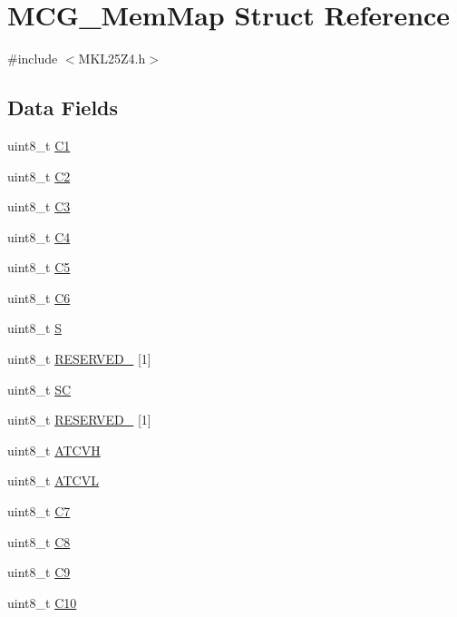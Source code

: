 \hypertarget{struct_m_c_g___mem_map}{}\section{M\+C\+G\+\_\+\+Mem\+Map Struct Reference}
\label{struct_m_c_g___mem_map}


{\ttfamily \#include $<$M\+K\+L25\+Z4.\+h$>$}

\subsection*{Data Fields}
\begin{DoxyCompactItemize}
\item 
uint8\+\_\+t \hyperlink{struct_m_c_g___mem_map_a433a36d1aeb9d033b502ee263c1495a1}{C1}
\item 
uint8\+\_\+t \hyperlink{struct_m_c_g___mem_map_a7323696b9a1cb6631b8c04ffad3947e5}{C2}
\item 
uint8\+\_\+t \hyperlink{struct_m_c_g___mem_map_a58ca70b30279c98af3471abe38280f01}{C3}
\item 
uint8\+\_\+t \hyperlink{struct_m_c_g___mem_map_a3c5615d70ed3f2d3664de1a8fdbe9983}{C4}
\item 
uint8\+\_\+t \hyperlink{struct_m_c_g___mem_map_a0e385950fe0f38c82eae57eb4ea2aaf3}{C5}
\item 
uint8\+\_\+t \hyperlink{struct_m_c_g___mem_map_ae7f9f9ae65de91e230a236ca4629380c}{C6}
\item 
uint8\+\_\+t \hyperlink{struct_m_c_g___mem_map_a65ee0333e0d5c462c7dd8c2402bf93be}{S}
\item 
uint8\+\_\+t \hyperlink{struct_m_c_g___mem_map_a4a2bbf23e6c51743e808ba42e79d6128}{R\+E\+S\+E\+R\+V\+E\+D\+\_} \mbox{[}1\mbox{]}
\item 
uint8\+\_\+t \hyperlink{struct_m_c_g___mem_map_aeff584aa52340d7c66dc06789ad05310}{SC}
\item 
uint8\+\_\+t \hyperlink{struct_m_c_g___mem_map_a612b54d367d5589e35fd249f6335f85c}{R\+E\+S\+E\+R\+V\+E\+D\+\_} \mbox{[}1\mbox{]}
\item 
uint8\+\_\+t \hyperlink{struct_m_c_g___mem_map_a74fee35955b4ec57aa8058bd57a926a8}{A\+T\+C\+VH}
\item 
uint8\+\_\+t \hyperlink{struct_m_c_g___mem_map_a913b6fd7776c0377e299fdf0eeb166af}{A\+T\+C\+VL}
\item 
uint8\+\_\+t \hyperlink{struct_m_c_g___mem_map_a7be430dafe8d0fddf4dbb83781946201}{C7}
\item 
uint8\+\_\+t \hyperlink{struct_m_c_g___mem_map_a346a8b8c5c2c675e6297aaa1f14798df}{C8}
\item 
uint8\+\_\+t \hyperlink{struct_m_c_g___mem_map_a35982b38fc8c8986c066146537c1c672}{C9}
\item 
uint8\+\_\+t \hyperlink{struct_m_c_g___mem_map_a184325f5e5750f8e816b01aeed13d695}{C10}
\end{DoxyCompactItemize}


